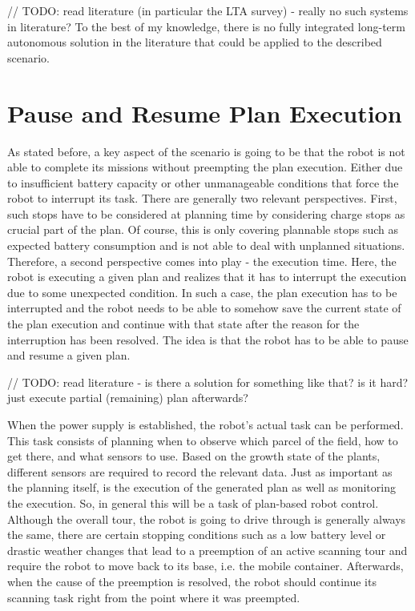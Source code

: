 \documentclass[german, master, expose, latin1]{base/thesis_KBS}
\begin{document}
// TODO: read literature (in particular the LTA survey) - really no such systems in literature?
To the best of my knowledge, there is no fully integrated long-term autonomous solution in the literature that could be applied to the described scenario.

\section{Pause and Resume Plan Execution}

As stated before, a key aspect of the scenario is going to be that the robot is not able to complete its missions without preempting the plan execution.
Either due to insufficient battery capacity or other unmanageable conditions that force the robot to interrupt its task.
There are generally two relevant perspectives. First, such stops have to be considered at planning time by considering charge stops as crucial part of the plan.
Of course, this is only covering plannable stops such as expected battery consumption and is not able to deal with unplanned situations. 
Therefore, a second perspective comes into play - the execution time. Here, the robot is executing a given plan and realizes that it has to interrupt the execution
due to some unexpected condition. In such a case, the plan execution has to be interrupted and the robot needs to be able to somehow save the current state of the plan
execution and continue with that state after the reason for the interruption has been resolved.
The idea is that the robot has to be able to pause and resume a given plan.\newline

// TODO: read literature - is there a solution for something like that? is it hard? just execute partial (remaining) plan afterwards?\newline

When the power supply is established, the robot's actual task can be performed. This task consists of planning when to observe which parcel of the field,
how to get there, and what sensors to use. Based on the growth state of the plants, different sensors are required to record the relevant data.
Just as important as the planning itself, is the execution of the generated plan as well as monitoring the execution.
So, in general this will be a task of plan-based robot control.
Although the overall tour, the robot is going to drive through is generally always the same, there are certain stopping conditions 
such as a low battery level or drastic weather changes that lead to a preemption of an active scanning tour and require the robot 
to move back to its base, i.e. the mobile container. Afterwards, when the cause of the preemption is resolved, 
the robot should continue its scanning task right from the point where it was preempted.\newline
\end{document}
